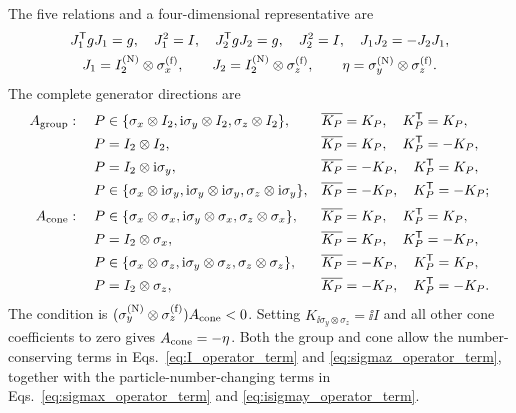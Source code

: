 The five relations and a four-dimensional representative are
\begin{equation}
\begin{gathered}
J_1^{\mathsf{T}} gJ_1=g,\quad J_1^2=I,\quad
J_2^{\mathsf{T}} gJ_2=g,\quad J_2^2=I,\quad
J_1J_2=-J_2J_1,\\
J_1=I_2^{({\rm N})}\otimes\sigma_x^{({\rm f})},\qquad
J_2=I_2^{({\rm N})}\otimes\sigma_z^{({\rm f})},\qquad
\eta=\sigma_y^{({\rm N})}\otimes\sigma_z^{({\rm f})}.
\end{gathered}
\end{equation}
The complete generator directions are
\begin{align*}
A_{\rm group}:\quad
P&\in\{\sigma_x\otimes I_2,\mathrm{i}\sigma_y\otimes I_2,\sigma_z\otimes I_2\},
&&\overline{K_P}=K_P,\quad K_P^{\mathsf{T}}=K_P,\\
P&=I_2\otimes I_2,&&\overline{K_P}=K_P,\quad K_P^{\mathsf{T}}=-K_P,\\
P&=I_2\otimes\mathrm{i}\sigma_y,&&\overline{K_P}=-K_P,\quad K_P^{\mathsf{T}}=K_P,\\
P&\in\{\sigma_x\otimes\mathrm{i}\sigma_y,\mathrm{i}\sigma_y\otimes\mathrm{i}\sigma_y,
\sigma_z\otimes\mathrm{i}\sigma_y\},&&\overline{K_P}=-K_P,\quad K_P^{\mathsf{T}}=-K_P;\\[2pt]
A_{\rm cone}:\quad
P&\in\{\sigma_x\otimes\sigma_x,\mathrm{i}\sigma_y\otimes\sigma_x,
\sigma_z\otimes\sigma_x\},&&\overline{K_P}=K_P,\quad K_P^{\mathsf{T}}=K_P,\\
P&=I_2\otimes\sigma_x,&&\overline{K_P}=K_P,\quad K_P^{\mathsf{T}}=-K_P,\\
P&\in\{\sigma_x\otimes\sigma_z,\mathrm{i}\sigma_y\otimes\sigma_z,
\sigma_z\otimes\sigma_z\},&&\overline{K_P}=-K_P,\quad K_P^{\mathsf{T}}=K_P,\\
P&=I_2\otimes\sigma_z,&&\overline{K_P}=-K_P,\quad K_P^{\mathsf{T}}=-K_P.
\end{align*}
The condition is \((\sigma_y^{({\rm N})}\otimes\sigma_z^{({\rm f})})A_{\rm cone}<0\).  Setting
\(K_{\ii\sigma_y\otimes\sigma_z}=\ii I\) and all other cone coefficients to zero gives \(A_{\rm cone}=-\eta\).  Both the group and cone allow the number-conserving terms in Eqs.~\eqref{eq:I_operator_term} and \eqref{eq:sigmaz_operator_term}, together with the particle-number-changing terms in Eqs.~\eqref{eq:sigmax_operator_term} and \eqref{eq:isigmay_operator_term}.

